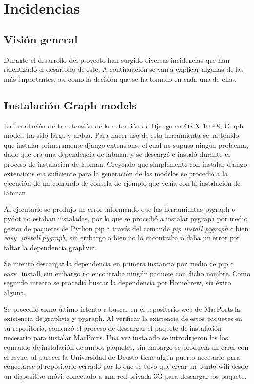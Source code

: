 \chapter{Incidencias}

\section{Visión general}

Durante el desarrollo del proyecto han surgido diversas incidencias que han ralentizado el desarrollo de este. A continuación se van a explicar algunas de las más importantes, así como la decisión que se ha tomado en cada una de ellas.

\section{Instalación Graph models}

La instalación de la extensión de la extensión de Django en OS X 10.9.8, Graph models ha sido larga y ardua. Para hacer uso de esta herramienta se ha tenido que instalar primeramente django-extensions, el cual no supuso ningún problema, dado que era una dependencia de \acrshort{labman} y se descargó e instaló durante el proceso de instalación de \acrshort{labman}. Creyendo que simplemente con instalar django-extensions era suficiente para la generación de los modelos se procedió a la ejecución de un comando de consola de ejemplo que venía con la instalación de \acrshort{labman}.

Al ejecutarlo se produjo un error informando que las herramientas pygraph o pydot no estaban instaladas, por lo que se procedió a instalar pygraph por medio gestor de paquetes de Python pip\cite{pip} a través del comando \textit{pip install pygraph} o bien \textit{easy\_install pygraph}, sin embargo o bien no lo encontraba o daba un error por faltar la dependencia graphviz.

Se intentó descargar la dependencia en primera instancia por medio de pip o easy\_install, sin embargo no encontraba ningún paquete con dicho nombre. Como segundo intento se procedió buscar la dependencia por Homebrew\cite{Homebrew}, sin éxito alguno.

Se procedió como último intento a buscar en el repositorio web de MacPorts\cite{MacPorts} la existencia de graphviz y pygraph. Al verificar la existencia de estos paquetes en su repositorio, comenzó el proceso de descargar el paquete de instalación necesario para instalar MacPorts. Una vez instalado se introdujeron los los comando de instalación de ambos paquetes, sin embargo se producía un error con el rsync, al parecer la Universidad de Deusto tiene algún puerto necesario para conectarse al repositorio cerrado por lo que se tuvo que crear un punto \acrshort{wifi} desde un dispositivo móvil conectado a una red privada 3G para descargar los paquete.

